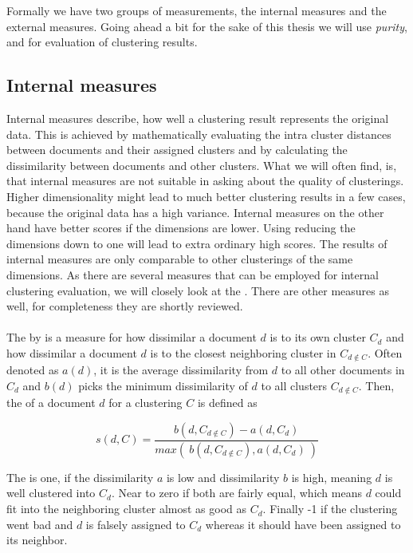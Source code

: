  Formally we have two groups of measurements, the internal measures and the external measures. Going ahead a bit for the sake of this thesis we will use \emph{purity}, \vmeasure{} and \silco{} for evaluation of clustering results.

  \subsection{Internal measures}
  \label{sec:internal_measures}

    Internal measures describe, how well a clustering result represents the original data. This is achieved by mathematically evaluating the intra cluster distances between documents and their assigned clusters and by calculating the dissimilarity between documents and other clusters. What we will often find, is, that internal measures are not suitable in asking about the quality of clusterings. Higher dimensionality might lead to much better clustering results in a few cases, because the original data has a high variance. Internal measures on the other hand have better scores if the dimensions are lower. Using \lsa{} reducing the dimensions down to one will lead to extra ordinary high scores. The results of internal measures are only comparable to other clusterings of the same dimensions. As there are several measures that can be employed for internal clustering evaluation, we will closely look at the \silco{}. There are other measures as well, for completeness they are shortly reviewed.

    \paragraph{} The \textbf{\silco{}} by \cite{Silhouettes1987} is a measure for how dissimilar a document $d$ is to its own cluster $C_d$ and how dissimilar a document $d$ is to the closest neighboring cluster in $C_{d \not \in C}$. Often denoted as $a(d)$, it is the average dissimilarity from $d$ to all other documents in $C_d$ and $b(d)$ picks the minimum dissimilarity of $d$ to all clusters $C_{d \not \in C}$. Then, the \silco{} of a document $d$ for a clustering $C$ is defined as

      \begin{equation}
        s(d, C) = \frac{b(d, C_{d \not \in C}) - a(d, C_d)}{max(\:b(d, C_{d \not \in C}), a(d, C_d)\:)}
      \end{equation} 

    The \silco{} is one, if the dissimilarity $a$ is low and dissimilarity $b$ is high, meaning $d$ is well clustered into $C_d$. Near to zero if both are fairly equal, which means $d$ could fit into the neighboring cluster almost as good as $C_d$. Finally -1 if the clustering went bad and $d$ is falsely assigned to $C_d$ whereas it should have been assigned to its neighbor.

